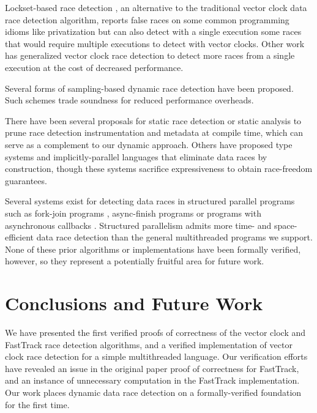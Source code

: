 \documentclass[preprint, 10pt]{sigplanconf}
\begin{document}
Lockset-based race detection \cite{dinning_detecting_1991,savage_eraser:_1997}, an alternative to the traditional vector clock data race detection algorithm, reports false races on some common programming idioms like privatization but can also detect with a single execution some races that would require multiple executions to detect with vector clocks. Other work has generalized vector clock race detection to detect more races from a single execution \cite{smaragdakis_sound_2012,sen_detecting_2005,chen_parametric_2007} at the cost of decreased performance.

Several forms of sampling-based dynamic race detection have been proposed. Such schemes trade soundness \cite{greathouse_demand-driven_2011,bond_pacer:_2010,marino_literace:_2009,erickson_effective_2010,effinger-dean_ifrit:_2012} for reduced performance overheads.

There have been several proposals for static race detection \cite{engler_racerx:_2003,naik_effective_2006} or static analysis \cite{flanagan_redcard:_2013,joserenau} to prune race detection instrumentation and metadata at compile time, which can serve as a complement to our dynamic approach. Others have proposed type systems \cite{abadi_types_2006,bocchino_type_2009,rust} and implicitly-parallel languages \cite{rinard_design_1998,guy_blelloch_nesl:_1992} that eliminate data races by construction, though these systems sacrifice expressiveness to obtain race-freedom guarantees.

Several systems exist for detecting data races in structured parallel programs such as fork-join programs \cite{john_mellor-crummey_--fly_1991,feng_efficient_1997,mai_zheng_grace:_2011,michael_boyer_automated_2008}, async-finish programs \cite{raman_scalable_2012} or programs with asynchronous callbacks \cite{petrov_race_2012,raychev_effective_2013,hsiao_race_2014,vechev_oopsla_2015}. Structured parallelism admits more time- and space-efficient data race detection than the general multithreaded programs we support. None of these prior algorithms or implementations have been formally verified, however, so they represent a potentially fruitful area for future work.

\section{Conclusions and Future Work}
\label{conclusion}

We have presented the first verified proofs of correctness of the vector clock and FastTrack race detection algorithms, and a verified implementation of vector clock race detection for a simple multithreaded language. Our verification efforts have revealed an issue in the original paper proof of correctness for FastTrack, and an instance of unnecessary computation in the FastTrack implementation. Our work places dynamic data race detection on a formally-verified foundation for the first time.
\end{document}
